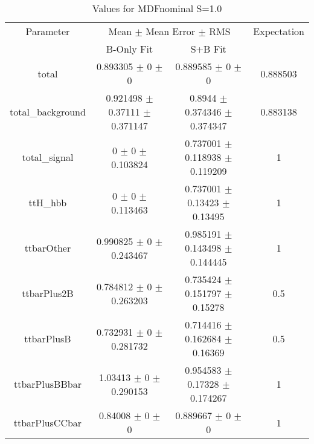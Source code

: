 \begin{table}
\centering
\caption{Values for MDFnominal S=1.0}
\begin{tabular}{cccc}
\toprule
Parameter & \multicolumn{2}{c}{Mean $\pm$ Mean Error $\pm$ RMS} & Expectation\\
 & B-Only Fit & S+B Fit & \\
\midrule
total & \num{0.893305} $\pm$ \num{0} $\pm$ \num{0} & \num{0.889585} $\pm$ \num{0} $\pm$ \num{0} & \num{0.888503}\\
total\_background & \num{0.921498} $\pm$ \num{0.37111} $\pm$ \num{0.371147} & \num{0.8944} $\pm$ \num{0.374346} $\pm$ \num{0.374347} & \num{0.883138}\\
total\_signal & \num{0} $\pm$ \num{0} $\pm$ \num{0.103824} & \num{0.737001} $\pm$ \num{0.118938} $\pm$ \num{0.119209} & \num{1}\\
ttH\_hbb & \num{0} $\pm$ \num{0} $\pm$ \num{0.113463} & \num{0.737001} $\pm$ \num{0.13423} $\pm$ \num{0.13495} & \num{1}\\
ttbarOther & \num{0.990825} $\pm$ \num{0} $\pm$ \num{0.243467} & \num{0.985191} $\pm$ \num{0.143498} $\pm$ \num{0.144445} & \num{1}\\
ttbarPlus2B & \num{0.784812} $\pm$ \num{0} $\pm$ \num{0.263203} & \num{0.735424} $\pm$ \num{0.151797} $\pm$ \num{0.15278} & \num{0.5}\\
ttbarPlusB & \num{0.732931} $\pm$ \num{0} $\pm$ \num{0.281732} & \num{0.714416} $\pm$ \num{0.162684} $\pm$ \num{0.16369} & \num{0.5}\\
ttbarPlusBBbar & \num{1.03413} $\pm$ \num{0} $\pm$ \num{0.290153} & \num{0.954583} $\pm$ \num{0.17328} $\pm$ \num{0.174267} & \num{1}\\
ttbarPlusCCbar & \num{0.84008} $\pm$ \num{0} $\pm$ \num{0} & \num{0.889667} $\pm$ \num{0} $\pm$ \num{0} & \num{1}\\
\bottomrule
\end{tabular}
\end{table}